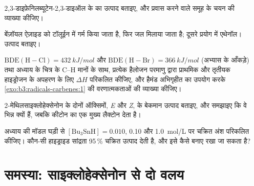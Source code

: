 \begin{exercise}[$\star\star$]\label{exo:b3:radicals-carbenes:8}
2,3-डाइफ़ेनिलब्यूटेन-2,3-डाइऑल के  का उत्पाद बताइए,
और प्रवास करने वाले समूह के चयन की व्याख्या कीजिए।
\end{exercise}

\begin{exercise}[$\star\star$]\label{exo:b3:radicals-carbenes:9}
बेंज़ॉयल ऐज़ाइड को टॉलूईन में गर्म किया जाता है, फिर जल मिलाया जाता है; दूसरे प्रयोग में
एथेनॉल। उत्पाद बताइए।
\end{exercise}

\begin{exercise}[$\star\star\star$]\label{exo:b3:radicals-carbenes:10}
$\mathrm{BDE(H{-}Cl)} = \qty{432}{kJ/mol}$ और $\mathrm{BDE(H{-}Br)} = \qty{366}{kJ/mol}$ (अभ्यास के आँकड़े) तथा अध्याय के चित्र के
C--H मानों के साथ, प्रत्येक हैलोजन परमाणु द्वारा प्राथमिक और तृतीयक
हाइड्रोजन के अपहरण के लिए $\Delta H$ परिकलित कीजिए, और हैमंड अभिगृहीत का उपयोग करके
\cref{exo:b3:radicals-carbenes:1} की वरणात्मकताओं की व्याख्या कीजिए।
\end{exercise}

\begin{exercise}[$\star\star\star$]\label{exo:b3:radicals-carbenes:11}
2-मेथिलसाइक्लोहेक्सेनोन के दोनों ऑक्सिमों, \textit{E} और \textit{Z}, के बेकमान उत्पाद बताइए,
और समझाइए कि वे भिन्न क्यों हैं, जबकि
कीटोन का  एक मुख्य लैक्टोन देता है।
\end{exercise}

\begin{exercise}[$\star\star\star$]\label{exo:b3:radicals-carbenes:12}
अध्याय की मॉडल घड़ी से $[\mathrm{Bu_3SnH}] = 0.010$,
0.10 और \qty{1.0}{mol/L} पर चक्रित अंश परिकलित कीजिए। कौन-सी हाइड्राइड सांद्रता 95\,\% चक्रित उत्पाद देती है, और इसे कैसे
बनाए रखा जा सकता है?
\end{exercise}

\section{समस्या: साइक्लोहेक्सेनोन से दो वलय}

